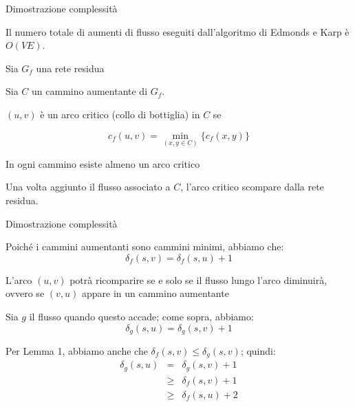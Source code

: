 \begin{frame}{Dimostrazione complessità}

\vspace{-9pt}
\begin{myboxtitle}
Il numero totale di aumenti di flusso eseguiti dall'algoritmo
di Edmonds e Karp è $O(VE)$.
\end{myboxtitle}

\BIL
\item Sia $G_f$ una rete residua
\item Sia $C$ un cammino aumentante di $G_f$. 
\item $(u,v)$ è un arco \alert{critico} (collo di bottiglia) in $C$ se 

\[
c_f(u,v) = \min_{(x,y \in C)} \{ c_f(x,y) \}
\]

\item In ogni cammino esiste almeno un arco critico
\item Una volta aggiunto il flusso associato a $C$, l'arco critico scompare dalla rete residua. 
\EIL

\end{frame}

\begin{frame}{Dimostrazione complessità}

\BIL
\item Poiché i cammini aumentanti sono cammini minimi, abbiamo che:
\[
 \delta_f(s,v) = \delta_f(s,u)+1
\]
\item L'arco $(u,v)$ potrà ricomparire se e solo se il flusso lungo l'arco 
diminuirà, ovvero se $(v,u)$ appare in un cammino aumentante
\item  Sia $g$ il flusso quando questo accade; come sopra, abbiamo:
\[
 \delta_{g}(s,u) = \delta_{g}(s,v)+1
\]
\item Per Lemma 1, abbiamo anche che $\delta_f(s,v)
\leq \delta_{g}(s,v)$; quindi:
\begin{eqnarray*}
\delta_{g}(s,u) &=& \delta_{g}(s,v)+1 \\
  & \geq & \delta_f(s,v) + 1 \\
  & \geq & \delta_f(s,u) + 2
\end{eqnarray*}
\EIL

\end{frame}

